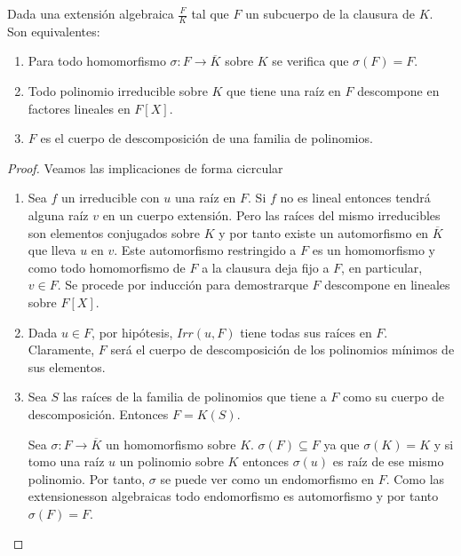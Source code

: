 \begin{proposition}
Dada una extensión algebraica $\frac{F}{K}$ tal que $F$ un subcuerpo de la clausura de $K$. Son equivalentes:

\begin{enumerate}
\item Para todo homomorfismo $\sigma:F \to \overline{K}$ sobre $K$ se verifica que $\sigma(F) = F$. 
\item Todo polinomio irreducible sobre $K$ que tiene una raíz en $F$ descompone en factores lineales en $F[X]$. 
\item $F$ es el cuerpo de descomposición de una familia de polinomios. 
\end{enumerate}
\end{proposition}
\begin{proof}
Veamos las implicaciones de forma cicrcular
\begin{enumerate}
\item Sea $f$ un irreducible con $u$ una raíz en $F$. Si $f$ no es lineal entonces tendrá alguna raíz $v$ en un cuerpo extensión. Pero las raíces del mismo irreducibles son elementos conjugados sobre $K$ y por tanto existe un automorfismo en $\overline{K}$ que lleva $u$ en $v$. Este automorfismo restringido a $F$ es un homomorfismo y como todo homomorfismo de $F$ a la clausura deja fijo a $F$, en particular, $v \in F$. Se procede por inducción para demostrarque $F$ descompone en lineales sobre $F[X]$. 
\item Dada $u \in F$, por hipótesis, $Irr(u,F)$ tiene todas sus raíces en $F$. Claramente, $F$ será el cuerpo de descomposición de los polinomios mínimos de sus elementos.
\item Sea $S$ las raíces de la familia de polinomios que tiene a $F$ como su cuerpo de descomposición. Entonces $F = K(S)$. 

Sea $\sigma:F \to \overline{K}$ un homomorfismo sobre $K$. $\sigma(F) \subseteq F$ ya que $\sigma(K) = K$ y si tomo una raíz $u$ un polinomio sobre $K$ entonces $\sigma(u)$ es raíz de ese mismo polinomio. Por tanto, $\sigma$ se puede ver como un endomorfismo en $F$. Como las extensionesson algebraicas todo endomorfismo es automorfismo y por tanto $\sigma(F) = F$. 
\end{enumerate}
\end{proof}

